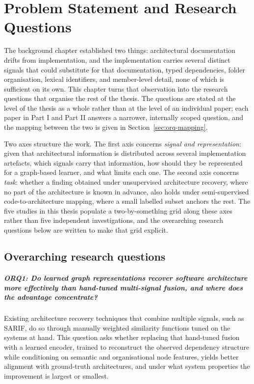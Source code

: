 \chapter{Problem Statement and Research Questions}
\label{ch:rqs}

The background chapter established two things: architectural documentation drifts from implementation, and the implementation carries several distinct signals that could substitute for that documentation, typed dependencies, folder organisation, lexical identifiers, and member-level detail, none of which is sufficient on its own. This chapter turns that observation into the research questions that organise the rest of the thesis. The questions are stated at the level of the thesis as a whole rather than at the level of an individual paper; each paper in Part I and Part II answers a narrower, internally scoped question, and the mapping between the two is given in Section~\ref{sec:orq-mapping}.

Two axes structure the work. The first axis concerns \emph{signal and representation}: given that architectural information is distributed across several implementation artefacts, which signals carry that information, how should they be represented for a graph-based learner, and what limits each one. The second axis concerns \emph{task}: whether a finding obtained under unsupervised architecture recovery, where no part of the architecture is known in advance, also holds under semi-supervised code-to-architecture mapping, where a small labelled subset anchors the rest. The five studies in this thesis populate a two-by-something grid along these axes rather than five independent investigations, and the overarching research questions below are written to make that grid explicit.

\section{Overarching research questions}
\label{sec:orqs}

\paragraph{ORQ1: Do learned graph representations recover software architecture more effectively than hand-tuned multi-signal fusion, and where does the advantage concentrate?}
Existing architecture recovery techniques that combine multiple signals, such as SARIF, do so through manually weighted similarity functions tuned on the systems at hand. This question asks whether replacing that hand-tuned fusion with a learned encoder, trained to reconstruct the observed dependency structure while conditioning on semantic and organisational node features, yields better alignment with ground-truth architectures, and under what system properties the improvement is largest or smallest.

